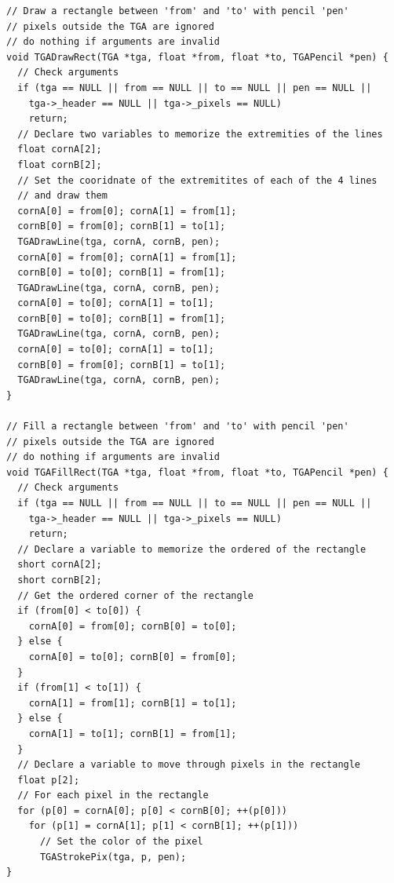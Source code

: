 \documentclass[12pt, a4paper]{article}
\begin{document}
\begin{scriptsize}
\begin{ttfamily}
\begin{lstlisting}
// Draw a rectangle between 'from' and 'to' with pencil 'pen'
// pixels outside the TGA are ignored
// do nothing if arguments are invalid
void TGADrawRect(TGA *tga, float *from, float *to, TGAPencil *pen) {
  // Check arguments
  if (tga == NULL || from == NULL || to == NULL || pen == NULL ||
    tga->_header == NULL || tga->_pixels == NULL)
    return;
  // Declare two variables to memorize the extremities of the lines
  float cornA[2];
  float cornB[2];
  // Set the cooridnate of the extremitites of each of the 4 lines
  // and draw them
  cornA[0] = from[0]; cornA[1] = from[1];
  cornB[0] = from[0]; cornB[1] = to[1];
  TGADrawLine(tga, cornA, cornB, pen);
  cornA[0] = from[0]; cornA[1] = from[1];
  cornB[0] = to[0]; cornB[1] = from[1];
  TGADrawLine(tga, cornA, cornB, pen);
  cornA[0] = to[0]; cornA[1] = to[1];
  cornB[0] = to[0]; cornB[1] = from[1];
  TGADrawLine(tga, cornA, cornB, pen);
  cornA[0] = to[0]; cornA[1] = to[1];
  cornB[0] = from[0]; cornB[1] = to[1];
  TGADrawLine(tga, cornA, cornB, pen);
}

// Fill a rectangle between 'from' and 'to' with pencil 'pen'
// pixels outside the TGA are ignored
// do nothing if arguments are invalid
void TGAFillRect(TGA *tga, float *from, float *to, TGAPencil *pen) {
  // Check arguments
  if (tga == NULL || from == NULL || to == NULL || pen == NULL ||
    tga->_header == NULL || tga->_pixels == NULL)
    return;
  // Declare a variable to memorize the ordered of the rectangle
  short cornA[2];
  short cornB[2];
  // Get the ordered corner of the rectangle
  if (from[0] < to[0]) {
    cornA[0] = from[0]; cornB[0] = to[0]; 
  } else {
    cornA[0] = to[0]; cornB[0] = from[0];
  }
  if (from[1] < to[1]) {
    cornA[1] = from[1]; cornB[1] = to[1]; 
  } else {
    cornA[1] = to[1]; cornB[1] = from[1];
  }
  // Declare a variable to move through pixels in the rectangle
  float p[2];
  // For each pixel in the rectangle
  for (p[0] = cornA[0]; p[0] < cornB[0]; ++(p[0]))
    for (p[1] = cornA[1]; p[1] < cornB[1]; ++(p[1]))
      // Set the color of the pixel
      TGAStrokePix(tga, p, pen);
}


\end{lstlisting}
\end{ttfamily}
\end{scriptsize}
\end{document}

